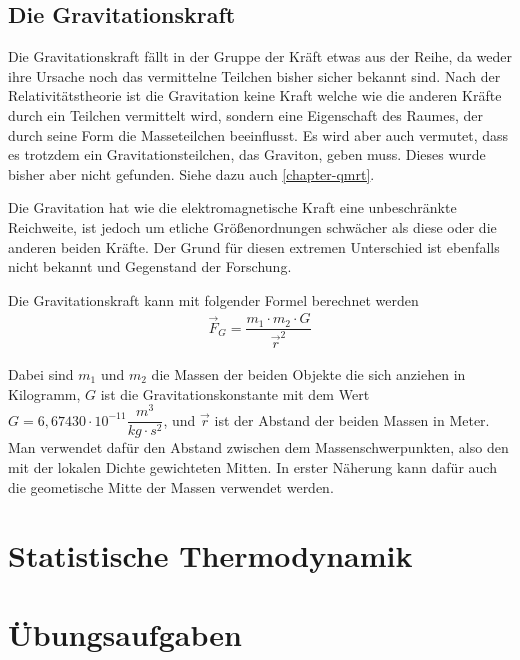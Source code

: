 \subsection{Die Gravitationskraft}

Die Gravitationskraft fällt in der Gruppe der Kräft etwas aus der Reihe, da weder ihre Ursache noch das vermittelne Teilchen bisher sicher bekannt sind. Nach der Relativitätstheorie ist die Gravitation keine Kraft welche wie die anderen Kräfte durch ein Teilchen vermittelt wird, sondern eine Eigenschaft des Raumes, der durch seine Form die Masseteilchen beeinflusst. Es wird aber auch vermutet, dass es trotzdem ein Gravitationsteilchen, das Graviton, geben muss. Dieses wurde bisher aber nicht gefunden. Siehe dazu auch \ref{chapter-qmrt}.

Die Gravitation hat wie die elektromagnetische Kraft eine unbeschränkte Reichweite, ist jedoch um etliche Größenordnungen schwächer als diese oder die anderen beiden Kräfte. Der Grund für diesen extremen Unterschied ist ebenfalls nicht bekannt und Gegenstand der Forschung.

Die Gravitationskraft kann mit folgender Formel berechnet werden
\begin{eqnarray}
\vec{F}_G=\dfrac{m_1 \cdot m_2 \cdot G}{\vec{r}^2}
\end{eqnarray}

Dabei sind $m_1$ und $m_2$ die Massen der beiden Objekte die sich anziehen in Kilogramm, $G$ ist die Gravitationskonstante mit dem Wert $G=6,67430\cdot 10^{-11} \dfrac{m^3}{kg \cdot s^2}$, und $\vec{r}$ ist der Abstand der beiden Massen in Meter. Man verwendet dafür den Abstand zwischen dem Massenschwerpunkten, also den mit der lokalen Dichte gewichteten Mitten. In erster Näherung kann dafür auch die geometische Mitte der Massen verwendet werden.

\section{Statistische Thermodynamik}
\lipsum[1]
\section{Übungsaufgaben}
\lipsum[1]